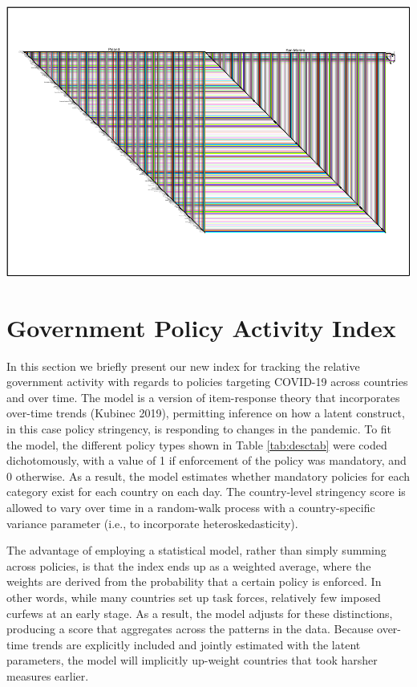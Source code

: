 \documentclass[]{article}
\begin{document}
\includegraphics{corona_wp_files/figure-latex/biofabric_europe-1.pdf}

\hypertarget{government-policy-activity-index}{%
\section{Government Policy Activity Index}\label{government-policy-activity-index}}

In this section we briefly present our new index for tracking the relative government activity with regards to policies targeting COVID-19 across countries and over time. The model is a version of item-response theory that incorporates over-time trends (Kubinec 2019), permitting inference on how a latent construct, in this case policy stringency, is responding to changes in the pandemic. To fit the model, the different policy types shown in Table \ref{tab:desctab} were coded dichotomously, with a value of 1 if enforcement of the policy was mandatory, and 0 otherwise. As a result, the model estimates whether mandatory policies for each category exist for each country on each day. The country-level stringency score is allowed to vary over time in a random-walk process with a country-specific variance parameter (i.e., to incorporate heteroskedasticity).

The advantage of employing a statistical model, rather than simply summing across policies, is that the index ends up as a weighted average, where the weights are derived from the probability that a certain policy is enforced. In other words, while many countries set up task forces, relatively few imposed curfews at an early stage. As a result, the model adjusts for these distinctions, producing a score that aggregates across the patterns in the data. Because over-time trends are explicitly included and jointly estimated with the latent parameters, the model will implicitly up-weight countries that took harsher measures earlier.
\end{document}
